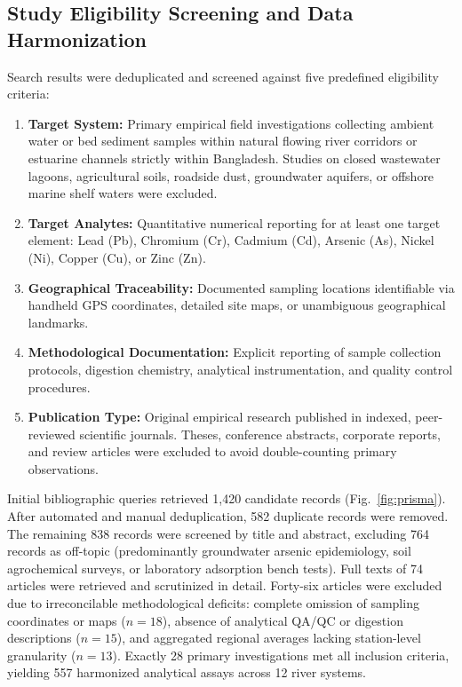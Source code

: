 \documentclass[authoryear,preprint,12pt]{elsarticle}
\begin{document}
\subsection{Study Eligibility Screening and Data Harmonization}
Search results were deduplicated and screened against five predefined eligibility criteria:
\begin{enumerate}
    \item \textbf{Target System:} Primary empirical field investigations collecting ambient water or bed sediment samples within natural flowing river corridors or estuarine channels strictly within Bangladesh. Studies on closed wastewater lagoons, agricultural soils, roadside dust, groundwater aquifers, or offshore marine shelf waters were excluded.
    \item \textbf{Target Analytes:} Quantitative numerical reporting for at least one target element: Lead (Pb), Chromium (Cr), Cadmium (Cd), Arsenic (As), Nickel (Ni), Copper (Cu), or Zinc (Zn).
    \item \textbf{Geographical Traceability:} Documented sampling locations identifiable via handheld GPS coordinates, detailed site maps, or unambiguous geographical landmarks.
    \item \textbf{Methodological Documentation:} Explicit reporting of sample collection protocols, digestion chemistry, analytical instrumentation, and quality control procedures.
    \item \textbf{Publication Type:} Original empirical research published in indexed, peer-reviewed scientific journals. Theses, conference abstracts, corporate reports, and review articles were excluded to avoid double-counting primary observations.
\end{enumerate}

Initial bibliographic queries retrieved 1,420 candidate records (Fig.~\ref{fig:prisma}). After automated and manual deduplication, 582 duplicate records were removed. The remaining 838 records were screened by title and abstract, excluding 764 records as off-topic (predominantly groundwater arsenic epidemiology, soil agrochemical surveys, or laboratory adsorption bench tests). Full texts of 74 articles were retrieved and scrutinized in detail. Forty-six articles were excluded due to irreconcilable methodological deficits: complete omission of sampling coordinates or maps ($n=18$), absence of analytical QA/QC or digestion descriptions ($n=15$), and aggregated regional averages lacking station-level granularity ($n=13$). Exactly 28 primary investigations met all inclusion criteria, yielding 557 harmonized analytical assays across 12 river systems.
\end{document}
